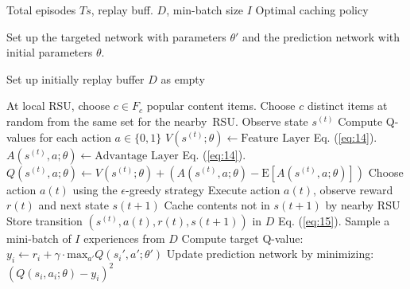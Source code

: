 \documentclass[journal]{IEEEtran}
\begin{document}
\begin{algorithm}[t]
\caption{Double Dueling Deep Q-Network (DDQN) Algorithm}
\label{alg:dueling_dqn}
\begin{algorithmic}[1]
\REQUIRE Total episodes $Ts$, replay buff. $D$, min-batch size $I$
\ENSURE Optimal caching policy

\STATE Set up the targeted network with parameters $\theta'$ and the prediction network with initial parameters $\theta$.

\STATE Set up initially replay buffer $D$ as empty

    \STATE At local RSU, choose $c \in F_c$ popular content items.
    \STATE Choose $c$ distinct items at random from the same set for the nearby RSU.
        \STATE Observe state $s^{(t)}$
        \STATE Compute Q-values for each action $a \in \{0, 1\}$
        \STATE $V(s^{(t)}; \theta) \leftarrow   \text{Feature Layer}$    Eq. (\ref{eq:14}).
        \STATE $A(s^{(t)}, a; \theta) \leftarrow \text{Advantage Layer}$   Eq. (\ref{eq:14}).
        \STATE $Q(s^{(t)},a;\theta) \leftarrow V(s^{(t)};\theta)+(A(s^{(t)},a;\theta)-\text{E}[A(s^{(t)},a;\theta)])$
        \STATE Choose action $a(t)$ using the $\epsilon$-greedy strategy
        \STATE Execute action $a(t)$, observe reward $r(t)$ and next state $s(t+1)$
        \STATE Cache contents not in $s(t+1)$ by nearby RSU
        \STATE Store transition $(s^{(t)}, a(t), r(t), s(t+1))$ in $D$  Eq. (\ref{eq:15}).
            \STATE Sample a mini-batch of $I$ experiences from $D$
                \STATE Compute target Q-value: $y_i \leftarrow r_i + \gamma \cdot \text{max}_{a'} Q(s_i', a'; \theta')$
                \STATE Update prediction network by minimizing: $(Q(s_i, a_i; \theta) - y_i)^2$
            \ENDFOR
        \ENDIF
    \ENDFOR
\ENDFOR

\end{algorithmic}
\end{algorithm}
\end{document}
